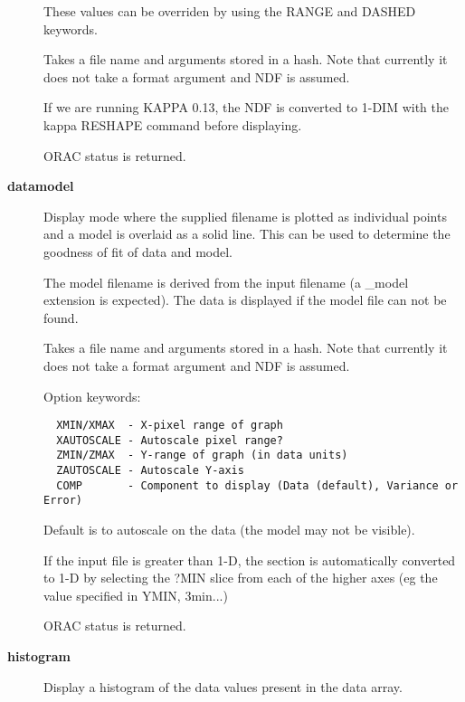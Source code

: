 \begin{description}
These values can be overriden by using the RANGE and DASHED 
keywords.



Takes a file name and arguments stored in a hash.
Note that currently it does not take a format argument
and NDF is assumed.



If we are running KAPPA 0.13, the NDF is converted
to 1-DIM with the kappa RESHAPE command before 
displaying.



ORAC status is returned.


\item[\textbf{datamodel}] \mbox{}

Display mode where the supplied filename is plotted as individual
points and a model is overlaid as a solid line. This can be used
to determine the goodness of fit of data and model.



The model filename is derived from the input filename (a \_model
extension is expected). The data is displayed if the model
file can not be found.



Takes a file name and arguments stored in a hash.
Note that currently it does not take a format argument
and NDF is assumed.



Option keywords:

\begin{verbatim}
  XMIN/XMAX  - X-pixel range of graph
  XAUTOSCALE - Autoscale pixel range?
  ZMIN/ZMAX  - Y-range of graph (in data units)
  ZAUTOSCALE - Autoscale Y-axis
  COMP       - Component to display (Data (default), Variance or Error)
\end{verbatim}


Default is to autoscale on the data (the model may not be visible).



If the input file is greater than 1-D, the section is automatically
converted to 1-D by selecting the ?MIN slice from each of the
higher axes (eg the value specified in YMIN, 3min...)



ORAC status is returned.


\item[\textbf{histogram}] \mbox{}

Display a histogram of the data values present in the 
data array.




\end{description}
